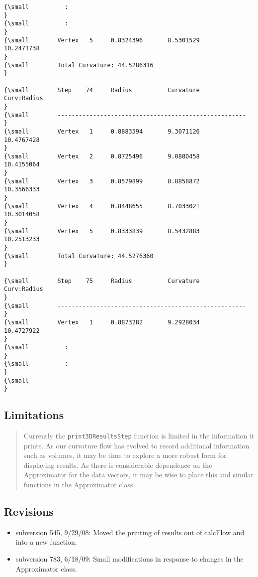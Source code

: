 \begin{verbatim}
{\small          :
}
{\small          :
}
{\small        Vertex   5     0.8324396       8.5301529       10.2471738
}
{\small        Total Curvature: 44.5286316
}
 
{\small        Step    74     Radius          Curvature        Curv:Radius
}
{\small        -----------------------------------------------------
}
{\small        Vertex   1     0.8883594       9.3071126       10.4767428
}
{\small        Vertex   2     0.8725496       9.0880458       10.4155064
}
{\small        Vertex   3     0.8579899       8.8858872       10.3566333
}
{\small        Vertex   4     0.8448655       8.7033021       10.3014058
}
{\small        Vertex   5     0.8333839       8.5432883       10.2513233
}
{\small        Total Curvature: 44.5276360
}
 
{\small        Step    75     Radius          Curvature        Curv:Radius
}
{\small        -----------------------------------------------------
}
{\small        Vertex   1     0.8873282       9.2928034       10.4727922
}
{\small          :
}
{\small          :
}
{\small   
}
\end{verbatim}

\subsection*{Limitations}

\begin{quotation}
Currently the \texttt{print3DResultsStep} function is limited in the
information it prints. As our curvature flow has evolved to record
additional information such as volumes, it may be time to explore a more
robust form for displaying results. As there is considerable dependence on
the Approximator for the data vectors, it may be wise to place this and
similar functions in the Approximator class.
\end{quotation}

\subsection*{Revisions}

\begin{itemize}
\item subversion 545, 9/29/08: Moved the printing of results out of calcFlow
and into a new function.

\item subversion 783, 6/18/09: Small modifications in response to changes in
the Approximator class.
\end{itemize}

